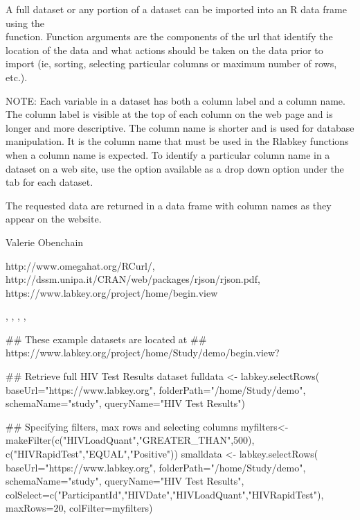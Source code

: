 \begin{Details}\relax
A full dataset or any portion of a dataset can be imported into an R data frame using the\\ 
 function. Function arguments are the components of the url that identify
the location of the data and what actions should be taken on the data prior to import
(ie, sorting, selecting particular columns or maximum number of rows, etc.).

NOTE: Each variable in a dataset has both a column label and a column name. The column label is visible at the top
of each column on the web page and is longer and more descriptive. The column name is shorter and is
used  for database manipulation. It is the column name that must be used in
the Rlabkey functions when a column name is expected. To identify a particular column name in a dataset on
a web site, use the  option available as a drop down option under the 
tab for each dataset.
\end{Details}
\begin{Value}
The requested data are returned in a data frame with column names as they appear on the website.
\end{Value}
\begin{Author}\relax
Valerie Obenchain
\end{Author}
\begin{References}\relax
http://www.omegahat.org/RCurl/,\\ 
http://dssm.unipa.it/CRAN/web/packages/rjson/rjson.pdf,\\
https://www.labkey.org/project/home/begin.view
\end{References}
\begin{SeeAlso}\relax
{}, , , 
, \\
\end{SeeAlso}
\begin{Examples}
\begin{ExampleCode}
## These example datasets are located at 
## https://www.labkey.org/project/home/Study/demo/begin.view?

## Retrieve full HIV Test Results dataset
fulldata <- labkey.selectRows(  
baseUrl="https://www.labkey.org", 
folderPath="/home/Study/demo", 
schemaName="study", 
queryName="HIV Test Results")

## Specifying filters, max rows and selecting columns
myfilters<- makeFilter(c("HIVLoadQuant","GREATER_THAN",500), 
c("HIVRapidTest","EQUAL","Positive"))
smalldata <- labkey.selectRows( 
baseUrl="https://www.labkey.org", 
folderPath="/home/Study/demo", 
schemaName="study",     
queryName="HIV Test Results", 
colSelect=c("ParticipantId","HIVDate","HIVLoadQuant","HIVRapidTest"), 
maxRows=20,
colFilter=myfilters)


\end{ExampleCode}
\end{Examples}

